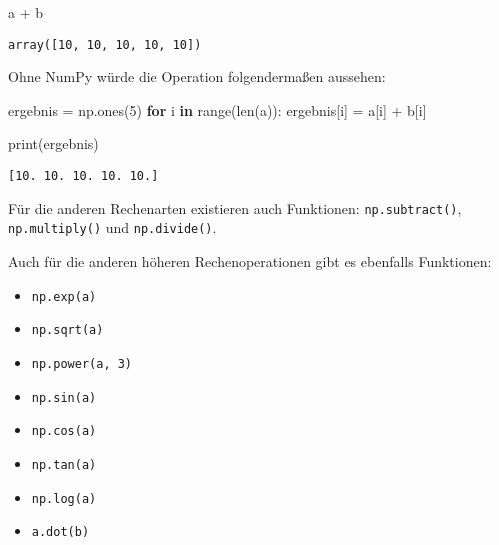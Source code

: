 \documentclass[
  letterpaper,
  DIV=11,
  numbers=noendperiod]{scrreprt}
\newenvironment{Shaded}{\begin{snugshade}}{\end{snugshade}}
\newcommand{\BuiltInTok}[1]{\textcolor[rgb]{0.00,0.23,0.31}{#1}}
\newcommand{\ControlFlowTok}[1]{\textcolor[rgb]{0.00,0.23,0.31}{\textbf{#1}}}
\newcommand{\DecValTok}[1]{\textcolor[rgb]{0.68,0.00,0.00}{#1}}
\newcommand{\KeywordTok}[1]{\textcolor[rgb]{0.00,0.23,0.31}{\textbf{#1}}}
\newcommand{\NormalTok}[1]{\textcolor[rgb]{0.00,0.23,0.31}{#1}}
\newcommand{\OperatorTok}[1]{\textcolor[rgb]{0.37,0.37,0.37}{#1}}
\providecommand{\tightlist}{%
  \setlength{\itemsep}{0pt}\setlength{\parskip}{0pt}}\usepackage{longtable,booktabs,array}
\begin{document}
\begin{tcolorbox}
\begin{Shaded}
\begin{Highlighting}[]
\NormalTok{a }\OperatorTok{+}\NormalTok{ b}
\end{Highlighting}
\end{Shaded}

\begin{verbatim}
array([10, 10, 10, 10, 10])
\end{verbatim}

Ohne NumPy würde die Operation folgendermaßen aussehen:

\begin{Shaded}
\begin{Highlighting}[]
\NormalTok{ergebnis }\OperatorTok{=}\NormalTok{ np.ones(}\DecValTok{5}\NormalTok{)}
\ControlFlowTok{for}\NormalTok{ i }\KeywordTok{in} \BuiltInTok{range}\NormalTok{(}\BuiltInTok{len}\NormalTok{(a)):}
\NormalTok{    ergebnis[i] }\OperatorTok{=}\NormalTok{ a[i] }\OperatorTok{+}\NormalTok{ b[i]}

\BuiltInTok{print}\NormalTok{(ergebnis)}
\end{Highlighting}
\end{Shaded}

\begin{verbatim}
[10. 10. 10. 10. 10.]
\end{verbatim}

Für die anderen Rechenarten existieren auch Funktionen:
\texttt{np.subtract()}, \texttt{np.multiply()} und \texttt{np.divide()}.

Auch für die anderen höheren Rechenoperationen gibt es ebenfalls
Funktionen:

\begin{itemize}
\tightlist
\item
  \texttt{np.exp(a)}
\item
  \texttt{np.sqrt(a)}
\item
  \texttt{np.power(a,\ 3)}
\item
  \texttt{np.sin(a)}
\item
  \texttt{np.cos(a)}
\item
  \texttt{np.tan(a)}
\item
  \texttt{np.log(a)}
\item
  \texttt{a.dot(b)}
\end{itemize}

\begin{tcolorbox}[enhanced jigsaw, breakable, opacityback=0, left=2mm, coltitle=black, leftrule=.75mm, colframe=quarto-callout-warning-color-frame, opacitybacktitle=0.6, toprule=.15mm, bottomtitle=1mm, titlerule=0mm, toptitle=1mm, title=\textcolor{quarto-callout-warning-color}{\faExclamationTriangle}\hspace{0.5em}{Arbeiten mit Winkelfunktionen}, colbacktitle=quarto-callout-warning-color!10!white, arc=.35mm, bottomrule=.15mm, rightrule=.15mm, colback=white]


\end{tcolorbox}
\end{tcolorbox}
\end{document}
